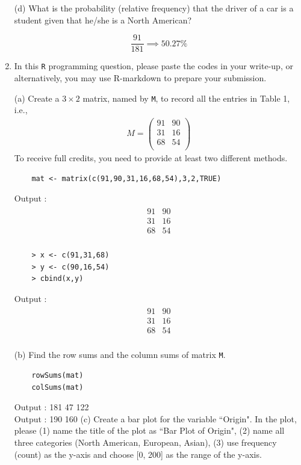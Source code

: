 \documentclass[letterpaper,12pt]{article}
\begin{document}
\begin{enumerate}
\subitem(d) What is the probability (relative frequency) that the driver of a car is a student given that he/she is a North American?

\[\frac{91}{181} \implies 50.27\%\]

\item In this \verb=R= programming question, please paste the codes in your write-up, or alternatively, you may use R-markdown to prepare your submission. 

\subitem(a) Create a $3 \times 2$ matrix, named by \verb=M=, to record all the entries in Table 1, i.e., 
\begin{align*}
M = \begin{pmatrix}
91 & 90 \\
31 & 16 \\
68 & 54\\
\end{pmatrix}
\end{align*} 
To receive full credits, you need to provide at least two different methods.

\begin{lstlisting}
	mat <- matrix(c(91,90,31,16,68,54),3,2,TRUE)
\end{lstlisting}
Output :  \begin{align*}
\begin{matrix}
91 & 90 \\
31 & 16 \\
68 & 54\\
\end{matrix}
\end{align*} 
\begin{lstlisting}
	> x <- c(91,31,68)
	> y <- c(90,16,54)
	> cbind(x,y)
\end{lstlisting}
Output :  \begin{align*}
\begin{matrix}
91 & 90 \\
31 & 16 \\
68 & 54\\
\end{matrix}
\end{align*} 

\subitem(b) Find the row sums and the column sums of matrix \verb=M=.

\begin{lstlisting}
	rowSums(mat)
	colSums(mat)
\end{lstlisting}
Output : 181  47 122 \\
Output : 190 160
\subitem(c) Create a bar plot for the variable ``Origin". In the plot, please (1) name the title of the plot as ``Bar Plot of Origin", (2) name all three categories (North American, European, Asian), (3) use frequency (count) as the y-axis and choose [0, 200] as the range of the y-axis. 


\end{enumerate}
\end{document}
